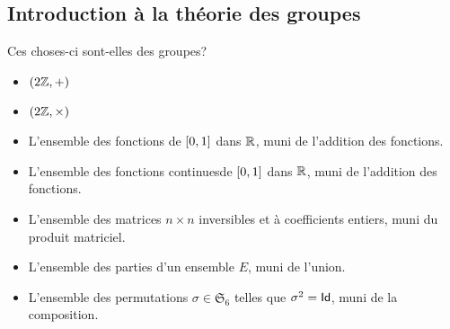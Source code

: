 \subsection*{Introduction à la théorie des groupes}\label{sec:tutorial_3}

\begin{td-exo}[Groupes] %
    Ces choses-ci sont-elles des groupes?
    \begin{itemize}
        \item \(\left(2\mathbb{Z},+\right)\)
        \item \(\left(2\mathbb{Z},\times\right)\)
        \item L'ensemble des fonctions de \(\mathopen{}\left[0,1\right]\mathclose{}\) dans \(\mathbb{R}\),
        muni de l'addition des fonctions.
        \item L'ensemble des fonctions continuesde \(\mathopen{}\left[0,1\right]\mathclose{}\) dans \(\mathbb{R}\),
        muni de l'addition des fonctions.
        \item L'ensemble des matrices \(n\times n\) inversibles et
        à coefficients entiers, muni du produit matriciel.
        \item L'ensemble des parties d'un ensemble \(E\), muni de
        l'union.
        \item L'ensemble des permutations \(\sigma\in\mathfrak{S}_6\)
        telles que \(\sigma^2=\operatorname{\mathsf{Id}}\), muni de la composition.
    \end{itemize}
\end{td-exo}
